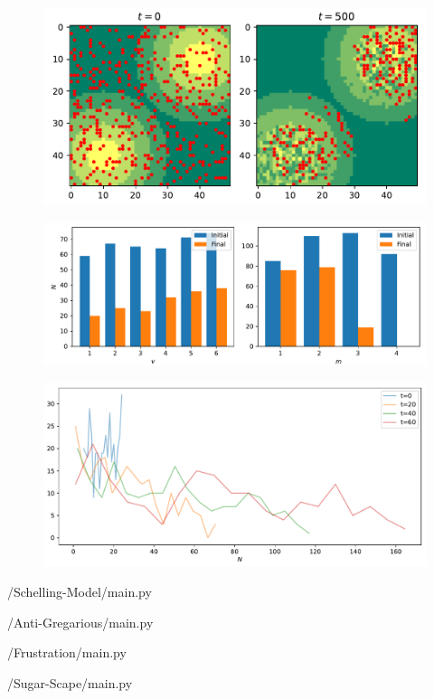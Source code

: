 \documentclass[a4paper, 12pt]{article}
\begin{document}
\newpage

\begin{figure}[h!]
    \centering
    \includegraphics[width=0.8\linewidth]{../Sugar-Scape/c.pdf}
\end{figure}

\begin{figure}[h!]
    \centering
    \includegraphics[width=\linewidth]{../Sugar-Scape/d.pdf}
\end{figure}

\begin{figure}[h!]
    \centering
    \includegraphics[width=\linewidth]{../Sugar-Scape/e.pdf}
\end{figure}


\newpage

/Schelling-Model/main.py

\newpage

/Anti-Gregarious/main.py

\newpage

/Frustration/main.py

\newpage

/Sugar-Scape/main.py

\newpage
\end{document}
